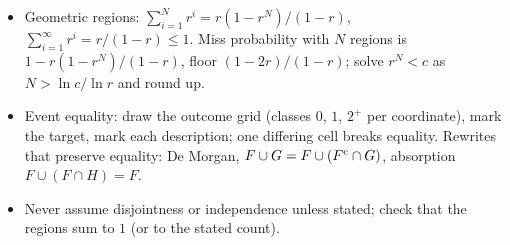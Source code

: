 \begin{itemize}[nosep]
        $\Prob(A\cup B\cup C\cup D) = \Prob(A \cup B \cup C) + \Prob(D)$.
  \item Geometric regions: $\sum_{i=1}^{N} r^i = r(1-r^N)/(1-r)$,
        $\sum_{i=1}^{\infty} r^i = r/(1-r) \le 1$. Miss probability with $N$ regions
        is $1 - r(1-r^N)/(1-r)$, floor $(1-2r)/(1-r)$; solve $r^N < c$ as
        $N > \ln c / \ln r$ and round up.
  \item Event equality: draw the outcome grid (classes $0$, $1$, $2^{+}$ per
        coordinate), mark the target, mark each description; one differing cell
        breaks equality. Rewrites that preserve equality: De Morgan,
        $F \cup G = F \cup (F^{\mathrm{c}}\cap G)$, absorption $F \cup (F \cap H) = F$.
  \item Never assume disjointness or independence unless stated; check that the
        regions sum to $1$ (or to the stated count).
\end{itemize}
